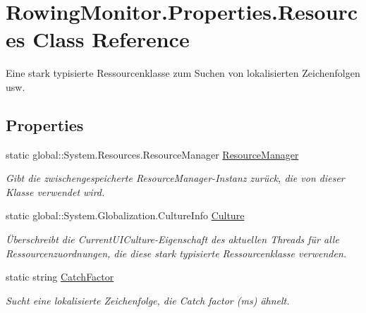 \hypertarget{class_rowing_monitor_1_1_properties_1_1_resources}{}\section{Rowing\+Monitor.\+Properties.\+Resources Class Reference}
\label{class_rowing_monitor_1_1_properties_1_1_resources}


Eine stark typisierte Ressourcenklasse zum Suchen von lokalisierten Zeichenfolgen usw.  


\subsection*{Properties}
\begin{DoxyCompactItemize}
\item 
static global\+::\+System.\+Resources.\+Resource\+Manager \hyperlink{class_rowing_monitor_1_1_properties_1_1_resources_ad922a285236bdd870f295d1094dc602d}{Resource\+Manager}
\begin{DoxyCompactList}\small\item\em Gibt die zwischengespeicherte Resource\+Manager-\/\+Instanz zurück, die von dieser Klasse verwendet wird. \end{DoxyCompactList}\item 
static global\+::\+System.\+Globalization.\+Culture\+Info \hyperlink{class_rowing_monitor_1_1_properties_1_1_resources_a99dee899703451cc2050cff9b778058a}{Culture}
\begin{DoxyCompactList}\small\item\em Überschreibt die Current\+U\+I\+Culture-\/\+Eigenschaft des aktuellen Threads für alle Ressourcenzuordnungen, die diese stark typisierte Ressourcenklasse verwenden. \end{DoxyCompactList}\item 
static string \hyperlink{class_rowing_monitor_1_1_properties_1_1_resources_a387e94c12ed72def984e5c51c268cf0a}{Catch\+Factor}
\begin{DoxyCompactList}\small\item\em Sucht eine lokalisierte Zeichenfolge, die Catch factor (ms) ähnelt. \end{DoxyCompactList}\item 

\end{DoxyCompactItemize}

